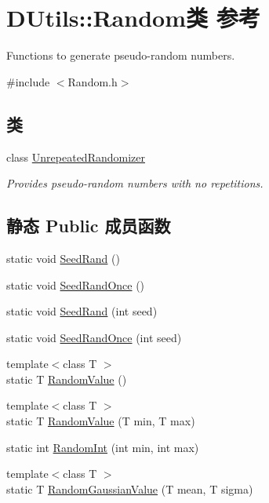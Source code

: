 \hypertarget{classDUtils_1_1Random}{\section{D\-Utils\-:\-:Random类 参考}
\label{classDUtils_1_1Random}
}


Functions to generate pseudo-\/random numbers.  




{\ttfamily \#include $<$Random.\-h$>$}

\subsection*{类}
\begin{DoxyCompactItemize}
\item 
class \hyperlink{classDUtils_1_1Random_1_1UnrepeatedRandomizer}{Unrepeated\-Randomizer}
\begin{DoxyCompactList}\small\item\em Provides pseudo-\/random numbers with no repetitions. \end{DoxyCompactList}\end{DoxyCompactItemize}
\subsection*{静态 Public 成员函数}
\begin{DoxyCompactItemize}
\item 
static void \hyperlink{classDUtils_1_1Random_a719a6489316343a771e062f0be58050f}{Seed\-Rand} ()
\item 
static void \hyperlink{classDUtils_1_1Random_a168e77d82ce1e66c6759e97ef27adbbc}{Seed\-Rand\-Once} ()
\item 
static void \hyperlink{classDUtils_1_1Random_aec19d58856a0cf0b48d783119a497233}{Seed\-Rand} (int seed)
\item 
static void \hyperlink{classDUtils_1_1Random_ad3652f5d105ca4f6f22696b64f2a4a5d}{Seed\-Rand\-Once} (int seed)
\item 
{\footnotesize template$<$class T $>$ }\\static T \hyperlink{classDUtils_1_1Random_ac5d2e4d977afdec30071c531a7a96d88}{Random\-Value} ()
\item 
{\footnotesize template$<$class T $>$ }\\static T \hyperlink{classDUtils_1_1Random_a13760f5d6d4b866fbcc350dbb0d39d02}{Random\-Value} (T min, T max)
\item 
static int \hyperlink{classDUtils_1_1Random_aa25012101ecbca54025d5430bcf93d86}{Random\-Int} (int min, int max)
\item 
{\footnotesize template$<$class T $>$ }\\static T \hyperlink{classDUtils_1_1Random_a2c769bcd60a08fc3eba3ef4abf9761d5}{Random\-Gaussian\-Value} (T mean, T sigma)
\end{DoxyCompactItemize}


